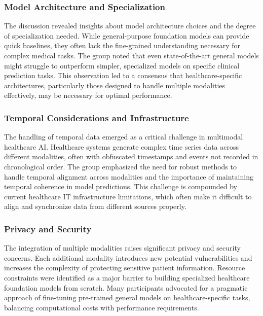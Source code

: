 \subsubsection{Model Architecture and Specialization}
The discussion revealed insights about model architecture choices and the degree of specialization needed. While general-purpose foundation models can provide quick baselines, they often lack the fine-grained understanding necessary for complex medical tasks. The group noted that even state-of-the-art general models might struggle to outperform simpler, specialized models on specific clinical prediction tasks. This observation led to a consensus that healthcare-specific architectures, particularly those designed to handle multiple modalities effectively, may be necessary for optimal performance.

\subsubsection{Temporal Considerations and Infrastructure}
The handling of temporal data emerged as a critical challenge in multimodal healthcare AI. Healthcare systems generate complex time series data across different modalities, often with obfuscated timestamps and events not recorded in chronological order. The group emphasized the need for robust methods to handle temporal alignment across modalities and the importance of maintaining temporal coherence in model predictions. This challenge is compounded by current healthcare IT infrastructure limitations, which often make it difficult to align and synchronize data from different sources properly.

\subsubsection{Privacy and Security}
The integration of multiple modalities raises significant privacy and security concerns. Each additional modality introduces new potential vulnerabilities and increases the complexity of protecting sensitive patient information. Resource constraints were identified as a major barrier to building specialized healthcare foundation models from scratch. Many participants advocated for a pragmatic approach of fine-tuning pre-trained general models on healthcare-specific tasks, balancing computational costs with performance requirements.

